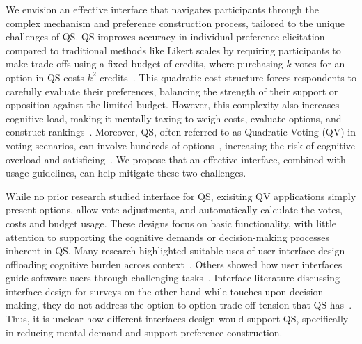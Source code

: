 We envision an effective interface that navigates participants through the complex mechanism and preference construction process, tailored to the unique challenges of QS. QS improves accuracy in individual preference elicitation compared to traditional methods like Likert scales by requiring participants to make trade-offs using a fixed budget of credits, where purchasing $k$ votes for an option in QS costs $k^2$ credits~\cite{quarfoot2017quadratic,chengCanShowWhat2021}. This quadratic cost structure forces respondents to carefully evaluate their preferences, balancing the strength of their support or opposition against the limited budget. However, this complexity also increases cognitive load, making it mentally taxing to weigh costs, evaluate options, and construct rankings~\cite{lichtensteinConstructionPreference2006}. Moreover, QS, often referred to as Quadratic Voting (QV) in voting scenarios, can involve hundreds of options~\cite{rogersColoradoTriedNew2019, teamTaiwanDigitalMinister}, increasing the risk of cognitive overload and satisficing~\cite{simonBehavioralModelRational1955, payneAdaptiveStrategySelection1988, tverskyJudgmentsRepresentativeness}. We propose that an effective interface, combined with usage guidelines, can help mitigate these two challenges.


While no prior research studied interface for QS, exisiting QV applications simply present options, allow vote adjustments, and automatically calculate the votes, costs and budget usage. These designs focus on basic functionality, with little attention to supporting the cognitive demands or decision-making processes inherent in QS. Many research highlighted suitable uses of user interface design offloading cognitive burden across context~\cite{paula2023, norman2013design, toepoelSmileysStarsHearts2019, softwareBrad2021}. Others showed how user interfaces guide software users through challenging tasks~\cite{task2014, moderate2021,amyChatSensing2018}. 
Interface literature discussing interface design for surveys on the other hand while touches upon decision making, they do not address the option-to-option trade-off tension that QS has~\cite{engstrom2020politics, weijtersEffectRatingScale2010, kierujVariationsResponseStyle2010, toepoelSmileysStarsHearts2019, farzandAestheticsEvaluatingResponse2024, pielotDidYouMisclick2024}. Thus, it is unclear how different interfaces design would support QS, specifically in reducing mental demand and support preference construction.


